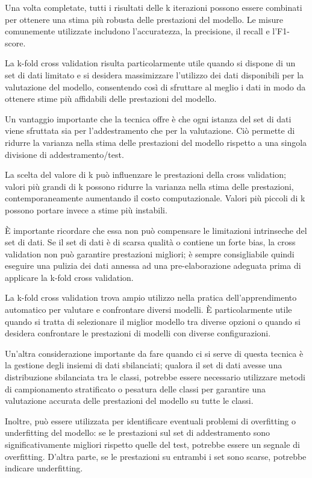 Una volta completate, tutti i risultati delle k iterazioni possono essere combinati per ottenere una stima più robusta delle prestazioni del modello. Le misure comunemente utilizzate includono l'accuratezza, la precisione, il recall e l'F1-score.

La k-fold cross validation risulta particolarmente utile quando si dispone di un set di dati limitato e si desidera massimizzare l'utilizzo dei dati disponibili per la valutazione del modello, consentendo così di sfruttare al meglio i dati in modo da ottenere stime più affidabili delle prestazioni del modello.

Un vantaggio importante che la tecnica offre è che ogni istanza del set di dati viene sfruttata sia per l'addestramento che per la valutazione. Ciò permette di ridurre la varianza nella stima delle prestazioni del modello rispetto a una singola divisione di addestramento/test.

La scelta del valore di k può influenzare le prestazioni della cross validation; valori più grandi di k possono ridurre la varianza nella stima delle prestazioni, contemporaneamente aumentando il costo computazionale. Valori più piccoli di k possono portare invece a stime più instabili.

È importante ricordare che essa non può compensare le limitazioni intrinseche del set di dati. Se il set di dati è di scarsa qualità o contiene un forte bias, la cross validation non può garantire prestazioni migliori; è sempre consigliabile quindi eseguire una pulizia dei dati annessa ad una pre-elaborazione adeguata prima di applicare la k-fold cross validation. 

La k-fold cross validation trova ampio utilizzo nella pratica dell'apprendimento automatico per valutare e confrontare diversi modelli. È particolarmente utile quando si tratta di selezionare il miglior modello tra diverse opzioni o quando si desidera confrontare le prestazioni di modelli con diverse configurazioni.

Un'altra considerazione importante da fare quando ci si serve di questa tecnica è la gestione degli insiemi di dati sbilanciati; qualora il set di dati avesse una distribuzione sbilanciata tra le classi, potrebbe essere necessario utilizzare metodi di campionamento stratificato o pesatura delle classi per garantire una valutazione accurata delle prestazioni del modello su tutte le classi.

Inoltre, può essere utilizzata per identificare eventuali problemi di overfitting o underfitting del modello: se le prestazioni sul set di addestramento sono significativamente migliori rispetto quelle del test, potrebbe essere un segnale di overfitting. D'altra parte, se le prestazioni su entrambi i set sono scarse, potrebbe indicare underfitting.

